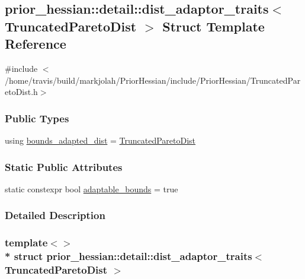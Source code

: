 \hypertarget{structprior__hessian_1_1detail_1_1dist__adaptor__traits_3_01TruncatedParetoDist_01_4}{}\subsection{prior\+\_\+hessian\+:\+:detail\+:\+:dist\+\_\+adaptor\+\_\+traits$<$ Truncated\+Pareto\+Dist $>$ Struct Template Reference}
\label{structprior__hessian_1_1detail_1_1dist__adaptor__traits_3_01TruncatedParetoDist_01_4}


{\ttfamily \#include $<$/home/travis/build/markjolah/\+Prior\+Hessian/include/\+Prior\+Hessian/\+Truncated\+Pareto\+Dist.\+h$>$}

\subsubsection*{Public Types}
\begin{DoxyCompactItemize}
\item 
using \hyperlink{structprior__hessian_1_1detail_1_1dist__adaptor__traits_3_01TruncatedParetoDist_01_4_a7f9f630089f2f3d15823d8115d4dc61b}{bounds\+\_\+adapted\+\_\+dist} = \hyperlink{namespaceprior__hessian_afebdccc7e1a35836f660f8a301af9cb2}{Truncated\+Pareto\+Dist}
\end{DoxyCompactItemize}
\subsubsection*{Static Public Attributes}
\begin{DoxyCompactItemize}
\item 
static constexpr bool \hyperlink{structprior__hessian_1_1detail_1_1dist__adaptor__traits_3_01TruncatedParetoDist_01_4_a79ae0c57937455992ff8394887808474}{adaptable\+\_\+bounds} = true
\end{DoxyCompactItemize}


\subsubsection{Detailed Description}
\subsubsection*{template$<$$>$\\*
struct prior\+\_\+hessian\+::detail\+::dist\+\_\+adaptor\+\_\+traits$<$ Truncated\+Pareto\+Dist $>$}



